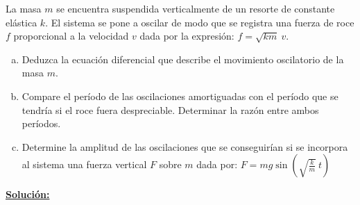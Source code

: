 	\begin{minipage}{0.6\textwidth}
		
		\item La masa $m$ se encuentra suspendida verticalmente de un resorte de constante el\'astica $k$. El sistema se pone a oscilar de modo que se registra una fuerza de roce $f$ proporcional a la velocidad $v$ dada por la expresi\'on: $f=\sqrt{k m} \ v$.
		
	\end{minipage}
	\begin{minipage}{0.4\textwidth}
	\end{minipage}

	\begin{enumerate}[a)]
		\item Deduzca la ecuaci\'on diferencial que describe el movimiento oscilatorio de la masa $m$.

		
		\item Compare el per\'iodo de las oscilaciones amortiguadas con el per\'iodo que se tendr\'ia si el roce fuera despreciable. Determinar la raz\'on entre ambos per\'iodos.
		

		\item Determine la amplitud de las oscilaciones que se conseguir\'ian si se incorpora al sistema una fuerza vertical $F$ sobre $m$ dada por: $F=mg \sin \left( \sqrt{\frac{k}{m}} \ t \right)$		
	\end{enumerate}

\textbf{\underline{Soluci\'on:}}

